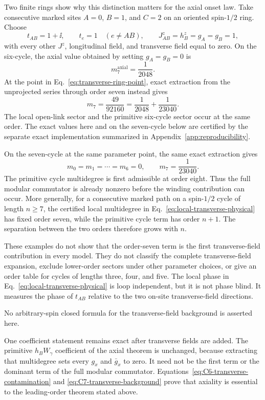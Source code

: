 Two finite rings show why this distinction matters for the axial onset law.
Take consecutive marked sites $A=0$, $B=1$, and $C=2$ on an oriented
spin-$1/2$ ring.  Choose
\begin{equation}
 t_{AB}=1+\ii,
 \qquad
 t_e=1\quad(e\ne AB),
 \qquad
 J^z_{AB}=h_B^z=g_A=g_B=1,
 \label{eq:transverse-ring-point}
\end{equation}
with every other $J^z$, longitudinal field, and transverse field equal to
zero.  On the six-cycle, the axial value obtained by setting $g_A=g_B=0$ is
\begin{equation}
 m_7^{\mathrm{axial}}=\frac1{2048}.
\end{equation}
At the point in Eq.~\eqref{eq:transverse-ring-point}, exact extraction from
the unprojected series through order seven instead gives
\begin{equation}
 m_7=\frac{49}{92160}
 =\frac1{2048}+\frac1{23040}.
 \label{eq:C6-transverse-contamination}
\end{equation}
The local open-link sector and the primitive six-cycle sector occur at the
same order.  The exact values here and on the seven-cycle below are certified
by the separate exact implementation summarized in
Appendix~\ref{app:reproducibility}.

On the seven-cycle at the same parameter point, the same exact extraction
gives
\begin{equation}
 m_0=m_1=\cdots=m_6=0,
 \qquad
 m_7=\frac1{23040}.
 \label{eq:C7-transverse-background}
\end{equation}
The primitive cycle multidegree is first admissible at order eight.  Thus the
full modular commutator is already nonzero before the winding contribution
can occur.  More generally, for a consecutive marked path on a spin-$1/2$
cycle of length $n\geq7$, the certified local multidegree in
Eq.~\eqref{eq:local-transverse-physical} has fixed order seven, while the
primitive cycle term has order $n+1$.  The separation between the two orders
therefore grows with $n$.

These examples do not show that the order-seven term is the first
transverse-field contribution in every model.  They do not classify the
complete transverse-field expansion, exclude lower-order sectors under other
parameter choices, or
give an order table for cycles of lengths three, four, and five.  The local
phase in Eq.~\eqref{eq:local-transverse-physical} is loop independent, but it
is not phase blind.  It measures the phase of $t_{AB}$ relative to the two
on-site transverse-field directions.

No arbitrary-spin closed formula for the transverse-field background is
asserted here.

One coefficient statement remains exact after transverse fields are added.
The primitive $h_BW_\gamma$ coefficient of the axial theorem is unchanged,
because extracting that multidegree sets every $g_x$ and $\bar g_x$ to zero.
It need not be the first term or the dominant term of the full modular
commutator.  Equations~\eqref{eq:C6-transverse-contamination} and
\eqref{eq:C7-transverse-background} prove that axiality is essential to the
leading-order theorem stated above.
